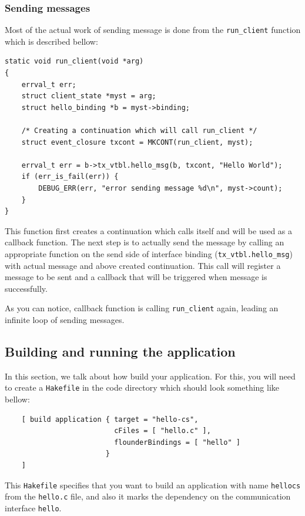 \subsubsection{Sending messages}

Most of the actual work of sending message is done from the \texttt{run\_client}
function which is described bellow:

\begin{verbatim}
static void run_client(void *arg)
{
    errval_t err;
    struct client_state *myst = arg;
    struct hello_binding *b = myst->binding;

    /* Creating a continuation which will call run_client */
    struct event_closure txcont = MKCONT(run_client, myst);

    errval_t err = b->tx_vtbl.hello_msg(b, txcont, "Hello World");
    if (err_is_fail(err)) {
        DEBUG_ERR(err, "error sending message %d\n", myst->count);
    }
}
\end{verbatim}

This function first creates a continuation which calls itself
and will be used as a callback function. The next step is to actually
send the message by calling an appropriate function on the send side of
interface binding (\texttt{tx\_vtbl.hello\_msg}) with actual message
and above created continuation.  This call will register a message to be sent
and a callback that will be triggered when message is successfully.

As you can notice, callback function is calling \texttt{run\_client} again,
leading an infinite loop of sending messages.

\subsection{Building and running the application}

In this section, we talk about how build your application.  For this, you
will need to create a \texttt{Hakefile} in the code directory which should
look something like bellow:

\begin{verbatim}
    [ build application { target = "hello-cs",
                          cFiles = [ "hello.c" ],
                          flounderBindings = [ "hello" ]
                        }
    ]
\end{verbatim}

This \texttt{Hakefile} specifies that you want to build an application
with name \texttt{hello\-cs} from the \texttt{hello.c} file, and also
it marks the dependency on the communication interface \texttt{hello}.

